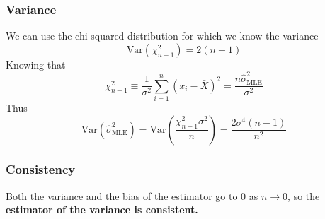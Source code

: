 \documentclass{article}
\DeclareMathOperator{\E}{\mathbb{E}}
\numberwithin{equation}{section}
\newcommand{\mle}[1]{\hat{#1}_{\text{MLE}}}
\begin{document}
\subsubsection{Variance}
We can use the chi-squared distribution for which we know the variance
\[
        \text{Var}(\chi^2_{n -1}) = 2(n - 1)
\]
Knowing that
\[
        \chi^2_{n -1} \equiv \frac{1}{\sigma^2}\sum_{i = 1}^n (x_i -\bar{X})^2 =
        \frac{n\mle{\sigma}^2}{\sigma^2}
\]
Thus
\[
\text{Var}(\mle{\sigma}^2) = \text{Var}\left( \frac{\chi^2_{n -1}\sigma^2}{n} \right)   
= \frac{2\sigma^4(n - 1)}{n^2}
\]

\subsubsection{Consistency}
Both the variance and the bias of the estimator 
go to 0 as $n \rightarrow 0$, so the \textbf{estimator of 
the variance is consistent.}
\end{document}
